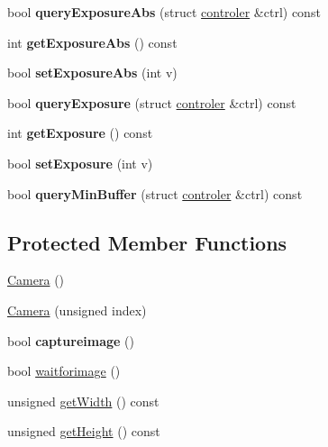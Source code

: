 \begin{DoxyCompactItemize}
\item 
bool {\bfseries query\+Exposure\+Abs} (struct \hyperlink{structcontroler}{controler} \&ctrl) const \hypertarget{classCamera_ab70714d470014801feca4df34ae2168c}{}\label{classCamera_ab70714d470014801feca4df34ae2168c}

\item 
int {\bfseries get\+Exposure\+Abs} () const \hypertarget{classCamera_a12ace77f46e4f5f6f2b7a5217109aeb4}{}\label{classCamera_a12ace77f46e4f5f6f2b7a5217109aeb4}

\item 
bool {\bfseries set\+Exposure\+Abs} (int v)\hypertarget{classCamera_a7e7d2edc5754f933e3a7716ca3c47ef6}{}\label{classCamera_a7e7d2edc5754f933e3a7716ca3c47ef6}

\item 
bool {\bfseries query\+Exposure} (struct \hyperlink{structcontroler}{controler} \&ctrl) const \hypertarget{classCamera_a7d725f27ae3b6e97764edb2b300add45}{}\label{classCamera_a7d725f27ae3b6e97764edb2b300add45}

\item 
int {\bfseries get\+Exposure} () const \hypertarget{classCamera_aba649b02d2c41a85abeb28520bef9158}{}\label{classCamera_aba649b02d2c41a85abeb28520bef9158}

\item 
bool {\bfseries set\+Exposure} (int v)\hypertarget{classCamera_af28839f021a92b97bac6afda689232c8}{}\label{classCamera_af28839f021a92b97bac6afda689232c8}

\item 
bool {\bfseries query\+Min\+Buffer} (struct \hyperlink{structcontroler}{controler} \&ctrl) const \hypertarget{classCamera_a9c34f884e5728853865c5fb098760425}{}\label{classCamera_a9c34f884e5728853865c5fb098760425}

\end{DoxyCompactItemize}
\subsection*{Protected Member Functions}
\begin{DoxyCompactItemize}
\item 
\hyperlink{classCamera_a01f94c3543f56ede7af49dc778f19331}{Camera} ()
\item 
\hyperlink{classCamera_a764d3e60f41d5caaf7a23d55f2c288b0}{Camera} (unsigned index)
\item 
bool {\bfseries captureimage} ()\hypertarget{classCamera_ae72461f2c1c0a42d1a3548373398dd76}{}\label{classCamera_ae72461f2c1c0a42d1a3548373398dd76}

\item 
bool \hyperlink{classCamera_a390cff9fec6a9b0cd3e893fec13ac358}{waitforimage} ()
\item 
unsigned \hyperlink{classCamera_a47d78517869974a0815f21b35179e61e}{get\+Width} () const 
\item 
unsigned \hyperlink{classCamera_a12fcce34a0f01cbede0fd7c2b0efdecb}{get\+Height} () const 
\end{DoxyCompactItemize}
